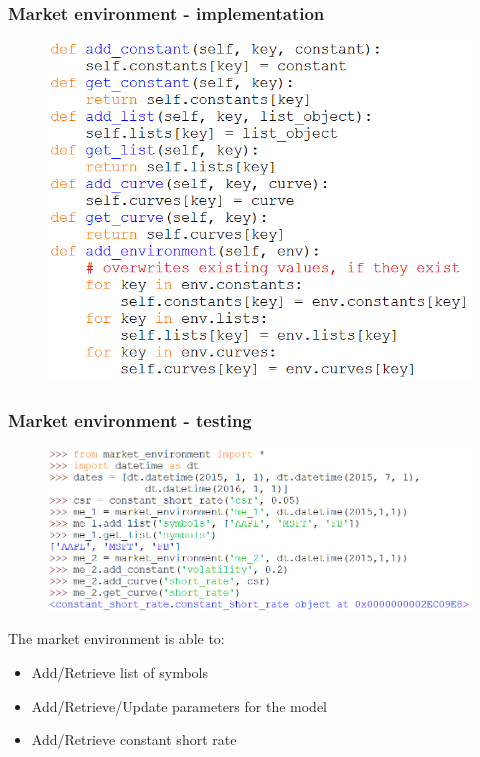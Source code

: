 \documentclass{beamer}
\begin{document}
\begin{frame}
\frametitle{Market environment - implementation}
\begin{figure}[H]
	\includegraphics[scale=0.5]{market_environment_2.png}
\end{figure}
\end{frame}

\begin{frame}
\frametitle{Market environment - testing}
\begin{figure}[H]
	\includegraphics[scale=0.45]{market_environment_example1.png}
\end{figure}
The market environment is able to:
\begin{itemize}
	\item Add/Retrieve list of symbols
	\item Add/Retrieve/Update parameters for the model
	\item Add/Retrieve constant short rate
\end{itemize}
\end{frame}
\end{document}
